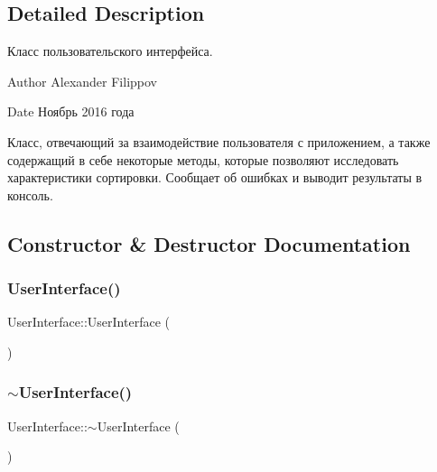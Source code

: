 \subsection{Detailed Description}
Класс пользовательского интерфейса. 

\begin{DoxyAuthor}{Author}
Alexander Filippov 
\end{DoxyAuthor}
\begin{DoxyDate}{Date}
Ноябрь 2016 года
\end{DoxyDate}
Класс, отвечающий за взаимодействие пользователя с приложением, а также содержащий в себе некоторые методы, которые позволяют исследовать характеристики сортировки. Сообщает об ошибках и выводит результаты в консоль. 

\subsection{Constructor \& Destructor Documentation}
\hypertarget{class_user_interface_ae6fb70370701b3bd6120e923df9705b0}{}\label{class_user_interface_ae6fb70370701b3bd6120e923df9705b0} 
\subsubsection{\texorpdfstring{User\+Interface()}{UserInterface()}}
{\footnotesize\ttfamily User\+Interface\+::\+User\+Interface (\begin{DoxyParamCaption}{ }\end{DoxyParamCaption})}

\hypertarget{class_user_interface_ae588b2ff1711a016dd4c6fc5002c0841}{}\label{class_user_interface_ae588b2ff1711a016dd4c6fc5002c0841} 
\subsubsection{\texorpdfstring{$\sim$\+User\+Interface()}{~UserInterface()}}
{\footnotesize\ttfamily User\+Interface\+::$\sim$\+User\+Interface (\begin{DoxyParamCaption}{ }\end{DoxyParamCaption})}



